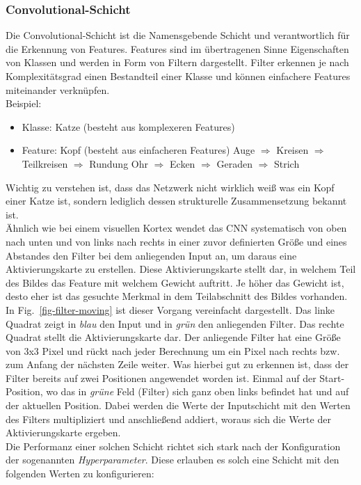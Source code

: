 \subsubsection{Convolutional-Schicht}
Die Convolutional-Schicht ist die Namensgebende Schicht und verantwortlich für die Erkennung von Features. Features sind im übertragenen Sinne Eigenschaften von Klassen und werden in Form von Filtern dargestellt. Filter erkennen je nach Komplexitätsgrad einen Bestandteil einer Klasse und können einfachere Features miteinander verknüpfen.\\
Beispiel:
\begin{itemize}
  \item Klasse: Katze (besteht aus komplexeren Features)
  \item Feature: Kopf (besteht aus einfacheren Features)
  \subitem Auge \(\Rightarrow\) Kreisen \(\Rightarrow\) Teilkreisen \(\Rightarrow\) Rundung
  \subitem Ohr \(\Rightarrow\) Ecken \(\Rightarrow\) Geraden \(\Rightarrow\) Strich
\end{itemize}
Wichtig zu verstehen ist, dass das Netzwerk nicht wirklich weiß was ein Kopf einer Katze ist, sondern lediglich dessen strukturelle Zusammensetzung bekannt ist.\\
Ähnlich wie bei einem visuellen Kortex wendet das CNN systematisch von oben nach unten und von links nach rechts in einer zuvor definierten Größe und eines Abstandes den Filter bei dem anliegenden Input an, um daraus eine Aktivierungskarte zu erstellen. Diese Aktivierungskarte stellt dar, in welchem Teil des Bildes das Feature mit welchem Gewicht auftritt. Je höher das Gewicht ist, desto eher ist das gesuchte Merkmal in dem Teilabschnitt des Bildes vorhanden. In Fig.~\ref{fig-filter-moving} ist dieser Vorgang vereinfacht dargestellt. Das linke Quadrat zeigt in \textit{blau} den Input und in \textit{grün} den anliegenden Filter. Das rechte Quadrat stellt die Aktivierungskarte dar. Der anliegende Filter hat eine Größe von 3x3 Pixel und rückt nach jeder Berechnung um ein Pixel nach rechts bzw. zum Anfang der nächsten Zeile weiter. Was hierbei gut zu erkennen ist, dass der Filter bereits auf zwei Positionen angewendet worden ist. Einmal auf der Start-Position, wo das in \textit{grüne} Feld (Filter) sich ganz oben links befindet hat und auf der aktuellen Position. Dabei werden die Werte der Inputschicht mit den Werten des Filters multipliziert und anschließend addiert, woraus sich die Werte der Aktivierungskarte ergeben.\\
Die Performanz einer solchen Schicht richtet sich stark nach der Konfiguration der sogenannten \textit{Hyperparameter}. Diese erlauben es solch eine Schicht mit den folgenden Werten zu konfigurieren:

